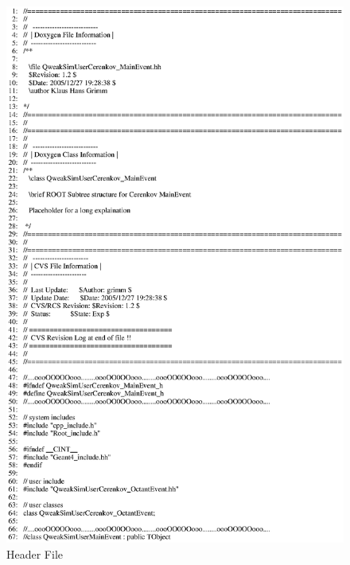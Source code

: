 \begin{figure}[ht]
  \hspace{0cm}
  \includegraphics[scale=0.8]{./figures5/QweakSimUserCerenkov_MainEvent.hh-p1.eps}
  \caption{\label{SourceV24} Header File}
           \label{fig:V-SC-28}
\end{figure}

\clearpage

